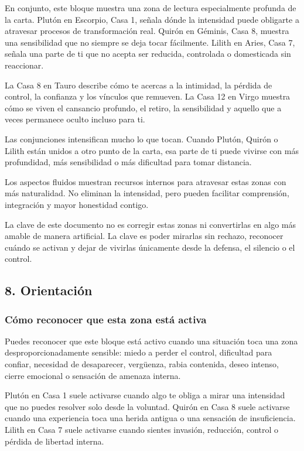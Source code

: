 \documentclass[11pt,a4paper]{article}
\begin{document}
En conjunto, este bloque muestra una zona de lectura especialmente profunda de la carta. Plutón en Escorpio, Casa 1, señala dónde la intensidad puede obligarte a atravesar procesos de transformación real. Quirón en Géminis, Casa 8, muestra una sensibilidad que no siempre se deja tocar fácilmente. Lilith en Aries, Casa 7, señala una parte de ti que no acepta ser reducida, controlada o domesticada sin reaccionar.

La Casa 8 en Tauro describe cómo te acercas a la intimidad, la pérdida de control, la confianza y los vínculos que remueven. La Casa 12 en Virgo muestra cómo se viven el cansancio profundo, el retiro, la sensibilidad y aquello que a veces permanece oculto incluso para ti.

Las conjunciones intensifican mucho lo que tocan. Cuando Plutón, Quirón o Lilith están unidos a otro punto de la carta, esa parte de ti puede vivirse con más profundidad, más sensibilidad o más dificultad para tomar distancia.

Los aspectos fluidos muestran recursos internos para atravesar estas zonas con más naturalidad. No eliminan la intensidad, pero pueden facilitar comprensión, integración y mayor honestidad contigo.

La clave de este documento no es corregir estas zonas ni convertirlas en algo más amable de manera artificial. La clave es poder mirarlas sin rechazo, reconocer cuándo se activan y dejar de vivirlas únicamente desde la defensa, el silencio o el control.

\vspace{0.4cm}

\subsection{8. Orientación}

\subsubsection*{Cómo reconocer que esta zona está activa}
Puedes reconocer que este bloque está activo cuando una situación toca una zona desproporcionadamente sensible: miedo a perder el control, dificultad para confiar, necesidad de desaparecer, vergüenza, rabia contenida, deseo intenso, cierre emocional o sensación de amenaza interna.

Plutón en Casa 1 suele activarse cuando algo te obliga a mirar una intensidad que no puedes resolver solo desde la voluntad. Quirón en Casa 8 suele activarse cuando una experiencia toca una herida antigua o una sensación de insuficiencia. Lilith en Casa 7 suele activarse cuando sientes invasión, reducción, control o pérdida de libertad interna.
\end{document}
